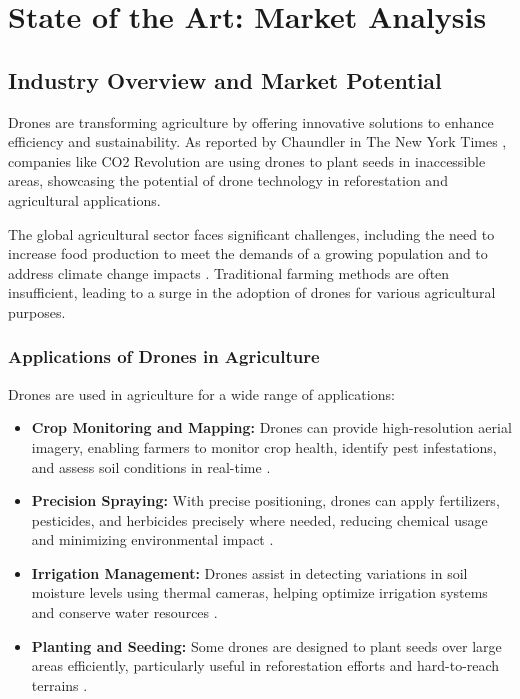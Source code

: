 \chapter{State of the Art: Market Analysis}

\section{Industry Overview and Market Potential}

Drones are transforming agriculture by offering innovative solutions to enhance efficiency and sustainability. As reported by Chaundler in The New York Times \cite{chaundler2021}, companies like CO2 Revolution \cite{co2_revolution} are using drones to plant seeds in inaccessible areas, showcasing the potential of drone technology in reforestation and agricultural applications.

The global agricultural sector faces significant challenges, including the need to increase food production to meet the demands of a growing population and to address climate change impacts \citep{nazarov2023}. Traditional farming methods are often insufficient, leading to a surge in the adoption of drones for various agricultural purposes.

\subsection{Applications of Drones in Agriculture}

Drones are used in agriculture for a wide range of applications:

\begin{itemize} 
	\item \textbf{Crop Monitoring and Mapping:} Drones can provide high-resolution aerial imagery, enabling farmers to monitor crop health, identify pest infestations, and assess soil conditions in real-time \citep{nazarov2023, alliedmarketresearch2021}. 
	\item \textbf{Precision Spraying:} With precise positioning, drones can apply fertilizers, pesticides, and herbicides precisely where needed, reducing chemical usage and minimizing environmental impact \citep{guardianagriculture, plantdiseasedetection2023}.
	\item \textbf{Irrigation Management:} Drones assist in detecting variations in soil moisture levels using thermal cameras, helping optimize irrigation systems and conserve water resources \citep{nazarov2023}. 
	\item \textbf{Planting and Seeding:} Some drones are designed to plant seeds over large areas efficiently, particularly useful in reforestation efforts and hard-to-reach terrains \citep{chaundler2021}. 
\end{itemize}

